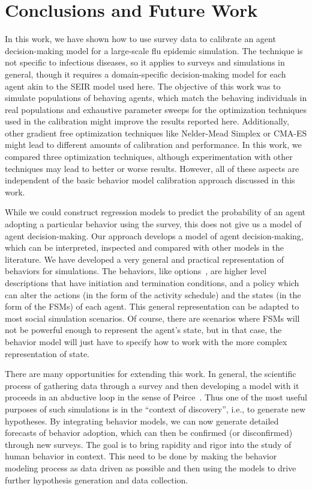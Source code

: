 \documentclass[doublespace]{VTthesis}
\begin{document}
    \chapter{Conclusions and Future Work} \label{ch:conclusions}
	In this work, we have shown how to use survey data to calibrate an agent decision-making model for a large-scale flu epidemic simulation. The technique is not specific to infectious diseases, so it applies to surveys and simulations in general, though it requires a domain-specific decision-making model for each agent akin to the SEIR model used here. The objective of this work was to simulate populations of behaving agents, which match the behaving individuals in real populations and exhaustive parameter sweeps for the optimization techniques used in the calibration might improve the results reported here. Additionally, other gradient free optimization techniques like Nelder-Mead Simplex or CMA-ES might lead to different amounts of calibration and performance. In this work, we compared three optimization techniques, although experimentation with other techniques may lead to better or worse results. However, all of these aspects are independent of the basic behavior model calibration approach discussed in this work. 
	
	While we could construct regression models to predict the probability of an agent adopting a particular behavior using the survey, this does not give us a model of agent decision-making. Our approach develops a model of agent decision-making, which can be interpreted, inspected and compared with other models in the literature. We have developed a very general and practical representation of behaviors for simulations. The behaviors, like options~\cite{sutton99options}, are higher level descriptions that have initiation and termination conditions, and a policy which can alter the actions (in the form of the activity schedule) and the states (in the form of the FSMs) of each agent. This general representation can be adapted to most social simulation scenarios. Of course, there are scenarios where FSMs will not be powerful enough to represent the agent's state, but in that case, the behavior model will just have to specify how to work with the more complex representation of state. 
	
    There are many opportunities for extending this work. In general, the scientific process of gathering data through a survey and then developing a model with it proceeds in an abductive loop in the sense of Peirce~\cite{peirce57abduction}. Thus one of the most useful purposes of such simulations is in the ``context of discovery'', i.e., to generate new hypotheses. By integrating behavior models, we can now generate detailed forecasts of behavior adoption, which can then be confirmed (or disconfirmed) through new surveys. The goal is to bring rapidity and rigor into the study of human behavior in context. This need to be done by making the behavior modeling process as data driven as possible and then using the models to drive further hypothesis generation and data collection. 
    
\end{document}
